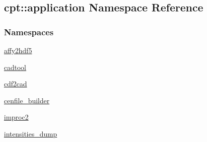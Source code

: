 \hypertarget{namespacecpt_1_1application}{\subsection{cpt\-:\-:application Namespace Reference}
\label{namespacecpt_1_1application}
}
\subsubsection*{Namespaces}
\begin{DoxyCompactItemize}
\item 
\hyperlink{namespacecpt_1_1application_1_1affy2hdf5}{affy2hdf5}
\item 
\hyperlink{namespacecpt_1_1application_1_1cadtool}{cadtool}
\item 
\hyperlink{namespacecpt_1_1application_1_1cdf2cad}{cdf2cad}
\item 
\hyperlink{namespacecpt_1_1application_1_1cenfile__builder}{cenfile\-\_\-builder}
\item 
\hyperlink{namespacecpt_1_1application_1_1improc2}{improc2}
\item 
\hyperlink{namespacecpt_1_1application_1_1intensities__dump}{intensities\-\_\-dump}
\end{DoxyCompactItemize}
